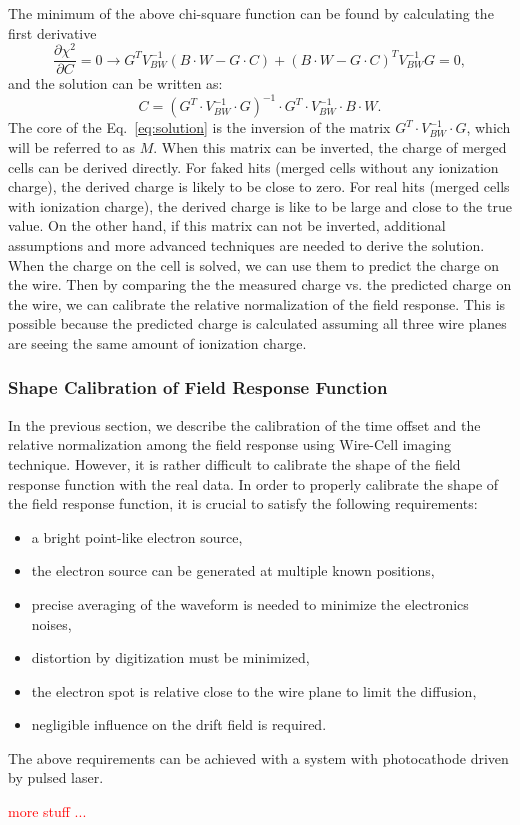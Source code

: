 The minimum of the above chi-square function can be found by calculating the 
first derivative
\begin{equation}
\frac{\partial \chi^2}{\partial C} = 0  \rightarrow
G^{T} V_{BW}^{-1} \left(B\cdot W - G\cdot C\right) +
\left(B\cdot W- G\cdot C\right)^{T} V_{BW}^{-1} G = 0,
\end{equation}
and the solution can be written as:
\begin{equation}\label{eq:solution}
C = \left( G^{T} \cdot V_{BW}^{-1} \cdot G \right)^{-1} \cdot G^{T} \cdot V_{BW}^{-1} \cdot B\cdot W.
\end{equation}
The core of the Eq.~\eqref{eq:solution} is the inversion of the matrix 
$G^{T} \cdot V_{BW}^{-1} \cdot G$, which will be referred to as $M$. 
When this matrix can be inverted, the charge
of merged cells can be derived directly. For faked hits (merged cells without 
any ionization charge), the derived charge is likely to be close to zero. For 
real hits (merged cells with ionization charge), the derived charge is like to be
large and close to the true value. On the other hand, if this matrix can not be
inverted, additional assumptions and more advanced techniques are needed to 
derive the solution. When the charge on the cell is 
solved, we can use them to predict the charge on the wire. Then by comparing the 
the measured charge vs. the predicted charge on the wire, we can calibrate the 
relative normalization of the field response. This is possible because the predicted
charge is calculated assuming all three wire planes are seeing the same amount of 
ionization charge. 


\subsubsection{Shape Calibration of Field Response Function}
In the previous section, we describe the calibration of the time offset and the relative normalization
among the field response using Wire-Cell imaging technique. However, it is rather difficult to 
calibrate the shape of the field response function with the real data. In order to properly 
calibrate the shape of the field response function, it is crucial to satisfy the following requirements:
\begin{itemize}
\item a bright point-like electron source,
\item the electron source can be generated at multiple known positions,
\item precise averaging of the waveform is needed to minimize the electronics noises,
\item distortion by digitization must be minimized,
\item the electron spot is relative close to the wire plane to limit the diffusion,
\item negligible influence on the drift field is required.
\end{itemize}

The above requirements can be achieved with a system with photocathode driven by pulsed laser. 

\textcolor{red}{more stuff ...}
